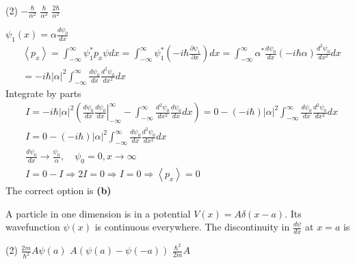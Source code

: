 \begin{enumerate}
	{}
\begin{tasks}(2)
	\task[\textbf{A.}] $-\frac{\hbar}{\alpha^{2}}$
	\task[\textbf{C.}]$\frac{\hbar}{\alpha^{2}}$
	\task[\textbf{D.}]$\frac{2 \hbar}{\alpha^{2}}$
\end{tasks}
\begin{answer}
	$\psi_{1}(x)=\alpha \frac{d \psi_{0}}{d x}$\\
	\begin{align*}
		&\left\langle p_{x}\right\rangle=\int_{-\infty}^{\infty} \psi_{1}^{*} p_{x} \psi d x=\int_{-\infty}^{\infty} \psi_{1}^{*}\left(-i \hbar \frac{\partial \psi_{1}}{\partial x}\right) d x=\int_{-\infty}^{\infty} \alpha^{*} \frac{d \psi_{0}}{d x}(-i \hbar \alpha) \frac{d^{2} \psi_{0}}{d x^{2}} d x \\
		&=-i \hbar|\alpha|^{2} \int_{-\infty}^{\infty} \frac{d \psi_{0}}{d x} \frac{d^{2} \psi_{0}}{d x^{2}} d x
	\end{align*}
	Integrate by parts
	\begin{align*}
	&I=-i \hbar|\alpha|^{2}\left(\left.\frac{d \psi_{0}}{d x} \frac{d \psi_{0}}{d x}\right|_{-\infty} ^{\infty}-\int_{-\infty}^{\infty} \frac{d^{2} \psi_{0}}{d x^{2}} \frac{d \psi_{0}}{d x} d x\right)=0-(-i \hbar)|\alpha|^{2} \int_{-\infty}^{\infty} \frac{d \psi_{0}}{d x} \frac{d^{2} \psi_{0}}{d x^{2}} d x \\
	&I=0-(-i \hbar)|\alpha|^{2} \int_{-\infty}^{\infty} \frac{d \psi_{0}}{d x} \frac{d^{2} \psi_{0}}{d x^{2}} d x \\
	&\frac{d \psi_{0}}{d x} \rightarrow \frac{\psi_{0}}{\alpha}, \quad \psi_{0}=0, x \rightarrow \infty \\
	&I=0-I \Rightarrow 2 I=0 \Rightarrow I=0 \Rightarrow\left\langle p_{x}\right\rangle=0
	\end{align*}
	The correct option is \textbf{(b)}
\end{answer}
\begin{minipage}{\textwidth}
	\item A particle in one dimension is in a potential $V(x)=A \delta(x-a)$. Its wavefunction $\psi(x)$ is continuous everywhere. The discontinuity in $\frac{d \psi}{d x}$ at $x=a$ is
\end{minipage}
\begin{tasks}(2)
	\task[\textbf{A.}] $\frac{2 m}{\hbar^{2}} A \psi(a)$
	\task[\textbf{B.}]$A(\psi(a)-\psi(-a))$
	\task[\textbf{C.}]$\frac{\hbar^{2}}{2 m} A$
\end{tasks}
\begin{answer}

\end{answer}
\end{enumerate}
